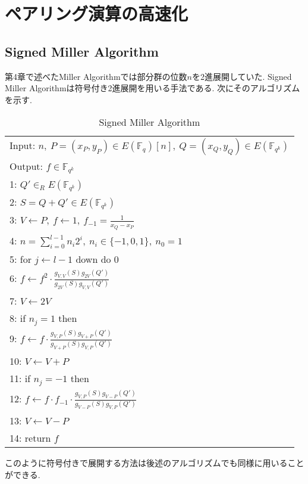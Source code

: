 \chapter{ペアリング演算の高速化}
\section{Signed Miller Algorithm}
第4章で述べたMiller Algorithmでは部分群の位数$n$を2進展開していた. Signed Miller Algorithmは符号付き2進展開を用いる手法である. 次にそのアルゴリズムを示す.
\par
\begin{table}[htbp]
 \begin{center}
  \begin{tabular}{|l|}
     \hline
     Input: $n, \ P = (x_P,y_P) \in E(\mathbb{F}_q)[n], \ Q = (x_Q,y_Q) \in E(\mathbb{F}_{q^k})$ \\
     Output: $f \in \mathbb{F}_{q^k}$  \\
     \hline
     1: \quad $Q' \in _R E(\mathbb{F}_{q^k})$\\
     2: \quad $S=Q+Q' \in E(\mathbb{F}_{q^k})$\\
     3: \quad $V \gets P, \ f \gets 1,\ f_{-1} = \frac{1}{x_Q - x_P}$\\
     4: \quad $n=\sum^{l - 1}_{i=0} n_i 2^i, \ n_i \in \{-1,0,1\},\ n_0 = 1$\\
     5: \quad for $j \gets l - 1$ down do 0\\
     6: \quad \quad $f \gets f^2 \cdot \frac{g_{V,V}(S)g_{2V}(Q')}{g_{2V}(S)g_{V,V}(Q')}$\\
     7: \quad \quad $V \gets 2V$\\
     8: \quad if $n_j = 1$ then\\
     9: \quad \quad $f \gets f \cdot \frac{g_{V,P}(S)g_{V + P}(Q')}{g_{V + P}(S)g_{V,P}(Q')}$\\
     10: \quad \quad $V \gets V + P$\\
     11: \quad if $n_j = -1$ then\\
     12: \quad \quad $f \gets f \cdot f_{-1} \cdot \frac{g_{V,P}(S)g_{V - P}(Q')}{g_{V - P}(S)g_{V,P}(Q')}$\\
     13: \quad \quad $V \gets V - P$\\
     14: \quad return $f$\\
     \hline
   \end{tabular}
 \end{center}
 \caption{Signed Miller Algorithm}
\end{table}
このように符号付きで展開する方法は後述のアルゴリズムでも同様に用いることができる.
\clearpage
